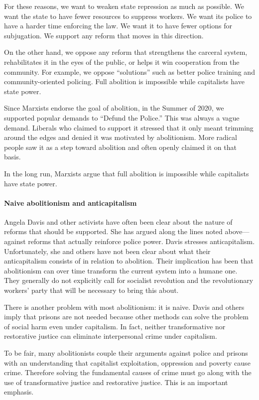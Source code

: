 For these reasons, we want to weaken state repression as much as possible. We want the state to have fewer resources to suppress workers. We want its police to have a harder time enforcing the law. We want it to have fewer options for subjugation. We support any reform that moves in this direction.

On the other hand, we oppose any reform that strengthens the carceral system, rehabilitates it in the eyes of the public, or helps it win cooperation from the community. For example, we oppose ``solutions'' such as better police training and community-oriented policing. Full abolition is impossible while capitalists have state power.

Since Marxists endorse the goal of abolition, in the Summer of 2020, we supported popular demands to ``Defund the Police.'' This was always a vague demand. Liberals who claimed to support it stressed that it only meant trimming around the edges and denied it was motivated by abolitionism. More radical people saw it as a step toward abolition and often openly claimed it on that basis.

In the long run, Marxists argue that full abolition is impossible while capitalists have state power.

\paragraph{Naive abolitionism and anticapitalism}

Angela Davis and other activists have often been clear about the nature of reforms that should be supported. She has argued along the lines noted above---against reforms that actually reinforce police power. Davis stresses anticapitalism. Unfortunately, she and others have not been clear about what their anticapitalism consists of in relation to abolition. Their implication has been that abolitionism can over time transform the current system into a humane one. They generally do not explicitly call for socialist revolution and the revolutionary workers' party that will be necessary to bring this about.

There is another problem with most abolitionism: it is naive. Davis and others imply that prisons are not needed because other methods can solve the problem of social harm even under capitalism. In fact, neither transformative nor restorative justice can eliminate interpersonal crime under capitalism.

To be fair, many abolitionists couple their arguments against police and prisons with an understanding that capitalist exploitation, oppression and poverty cause crime. Therefore solving the fundamental causes of crime must go along with the use of transformative justice and restorative justice. This is an important emphasis.

